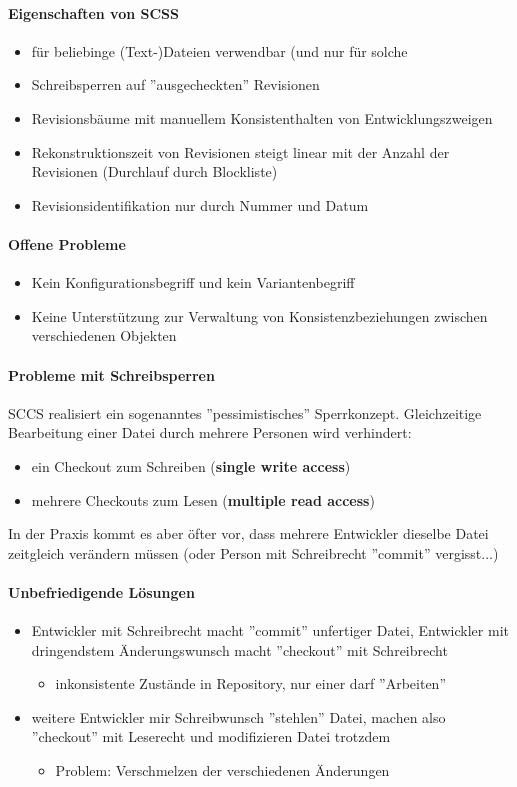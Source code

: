 \paragraph{Eigenschaften von SCSS}
\begin{itemize}
	\item für beliebinge (Text-)Dateien verwendbar (und nur für solche
	\item Schreibsperren auf ''ausgecheckten'' Revisionen
	\item Revisionsbäume mit manuellem Konsistenthalten von Entwicklungszweigen
	\item Rekonstruktionszeit von Revisionen steigt linear mit der Anzahl der Revisionen (Durchlauf durch Blockliste)
	\item Revisionsidentifikation nur durch Nummer und Datum
\end{itemize}
\paragraph{Offene Probleme}
\begin{itemize}
	\item Kein Konfigurationsbegriff und kein Variantenbegriff
	\item Keine Unterstützung zur Verwaltung von Konsistenzbeziehungen zwischen verschiedenen Objekten
\end{itemize}
\paragraph{Probleme mit Schreibsperren}
SCCS realisiert ein sogenanntes ''pessimistisches'' Sperrkonzept. Gleichzeitige Bearbeitung einer Datei durch mehrere Personen wird verhindert:
\begin{itemize}
	\item ein Checkout zum Schreiben (\textbf{single write access})
	\item mehrere Checkouts zum Lesen (\textbf{multiple read access})
\end{itemize}
In der Praxis kommt es aber öfter vor, dass mehrere Entwickler dieselbe Datei zeitgleich verändern müssen (oder Person mit Schreibrecht ''commit'' vergisst...)
\paragraph{Unbefriedigende Lösungen}
\begin{itemize}
	\item Entwickler mit Schreibrecht macht ''commit'' unfertiger Datei, Entwickler mit dringendstem Änderungswunsch macht ''checkout'' mit Schreibrecht
	\begin{itemize}
		\item inkonsistente Zustände in Repository, nur einer darf ''Arbeiten''
	\end{itemize}
	\item weitere Entwickler mir Schreibwunsch ''stehlen'' Datei, machen also ''checkout'' mit Leserecht und modifizieren Datei trotzdem
	\begin{itemize}
		\item Problem: Verschmelzen der verschiedenen Änderungen
	\end{itemize}
\end{itemize}
